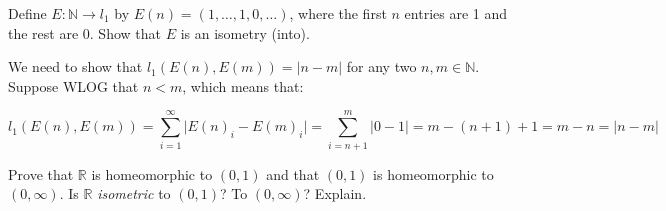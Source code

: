 \begin{exercise}{47}
    Define $E: \mathbb{N} \rightarrow l_1$ by $E(n) = (1, \ldots, 1, 0, \ldots)$, where the first $n$ entries are 1 and the rest are 0.
    Show that $E$ is an isometry (into).
\end{exercise}

\begin{solution}
    
    We need to show that $l_1(E(n), E(m)) = \lvert n - m \rvert$ for any two $n, m \in \mathbb{N}$.
    Suppose WLOG that $n < m$, which means that:

    \[l_1(E(n), E(m)) = \sum_{i=1}^{\infty} \lvert E(n)_i - E(m)_i \rvert = \sum_{i=n + 1}^{m} \lvert 0 - 1 \rvert = m - (n + 1) + 1 = m - n = \lvert n - m \rvert \]
\end{solution}

\begin{exercise}{48}
    Prove that $\mathbb{R}$ is homeomorphic to $(0, 1)$ and that $(0, 1)$ is homeomorphic to $(0, \infty)$.
    Is $\mathbb{R}$ \textit{isometric} to $(0, 1)$?
    To $(0, \infty)$?
    Explain.
\end{exercise}

